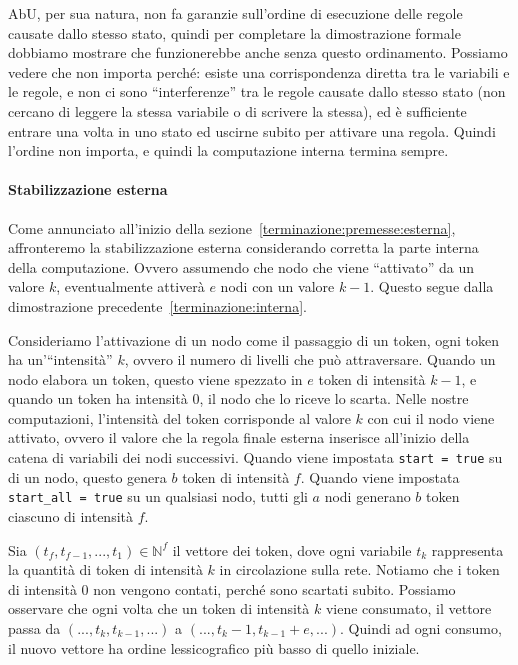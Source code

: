 \documentclass[12pt, a4paper]{article}
\begin{document}
AbU, per sua natura, non fa garanzie sull'ordine di esecuzione delle regole causate dallo stesso stato, quindi per completare la dimostrazione formale dobbiamo mostrare che funzionerebbe anche senza questo ordinamento.
Possiamo vedere che non importa perché: esiste una corrispondenza diretta tra le variabili e le regole, e non ci sono ``interferenze'' tra le regole causate dallo stesso stato (non cercano di leggere la stessa variabile o di scrivere la stessa), ed è sufficiente entrare una volta in uno stato ed uscirne subito per attivare una regola.
Quindi l'ordine non importa, e quindi la computazione interna termina sempre.\label{terminazione:interna:ordinamento}

\paragraph{Stabilizzazione esterna}

Come annunciato all'inizio della sezione~\ref{terminazione:premesse:esterna}, affronteremo la stabilizzazione esterna considerando corretta la parte interna della computazione. Ovvero assumendo che nodo che viene ``attivato'' da un valore $k$, eventualmente attiverà $e$ nodi con un valore $k-1$. Questo segue dalla dimostrazione precedente~\ref{terminazione:interna}.

Consideriamo l'attivazione di un nodo come il passaggio di un token, ogni token ha un'``intensità'' $k$, ovvero il numero di livelli che può attraversare. Quando un nodo elabora un token, questo viene spezzato in $e$ token di intensità $k-1$, e quando un token ha intensità $0$, il nodo che lo riceve lo scarta.
Nelle nostre computazioni, l'intensità del token corrisponde al valore $k$ con cui il nodo viene attivato, ovvero il valore che la regola finale esterna inserisce all'inizio della catena di variabili dei nodi successivi. Quando viene impostata \lstinline{start = true} su di un nodo, questo genera $b$ token di intensità $f$. Quando viene impostata \lstinline{start_all = true} su un qualsiasi nodo, tutti gli $a$ nodi generano $b$ token ciascuno di intensità $f$.

Sia $(t_f,t_{f-1},...,t_1)\in\mathbb{N}^f$ il vettore dei token, dove ogni variabile $t_k$ rappresenta la quantità di token di intensità $k$ in circolazione sulla rete. Notiamo che i token di intensità $0$ non vengono contati, perché sono scartati subito.
Possiamo osservare che ogni volta che un token di intensità $k$ viene consumato, il vettore passa da $(...,t_k,t_{k-1},...)$ a $(...,t_k-1,t_{k-1}+e,...)$. Quindi ad ogni consumo, il nuovo vettore ha ordine lessicografico più basso di quello iniziale.
\end{document}

